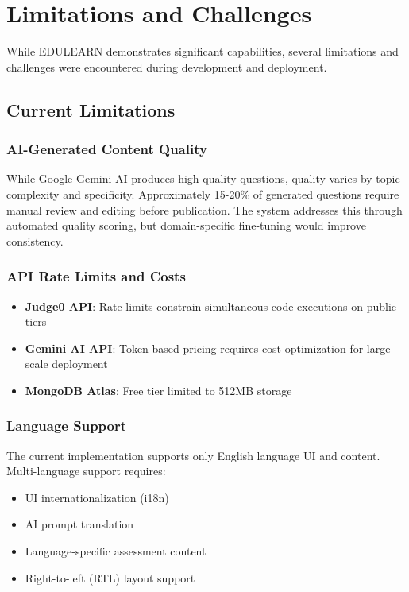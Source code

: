 \documentclass[conference]{IEEEtran}
\begin{document}
\section{Limitations and Challenges}

While EDULEARN demonstrates significant capabilities, several limitations and challenges were encountered during development and deployment.

\subsection{Current Limitations}

\subsubsection{AI-Generated Content Quality}
While Google Gemini AI produces high-quality questions, quality varies by topic complexity and specificity. Approximately 15-20\% of generated questions require manual review and editing before publication. The system addresses this through automated quality scoring, but domain-specific fine-tuning would improve consistency.

\subsubsection{API Rate Limits and Costs}
\begin{itemize}
    \item \textbf{Judge0 API}: Rate limits constrain simultaneous code executions on public tiers
    \item \textbf{Gemini AI API}: Token-based pricing requires cost optimization for large-scale deployment
    \item \textbf{MongoDB Atlas}: Free tier limited to 512MB storage
\end{itemize}

\subsubsection{Language Support}
The current implementation supports only English language UI and content. Multi-language support requires:
\begin{itemize}
    \item UI internationalization (i18n)
    \item AI prompt translation
    \item Language-specific assessment content
    \item Right-to-left (RTL) layout support
\end{itemize}
\end{document}
